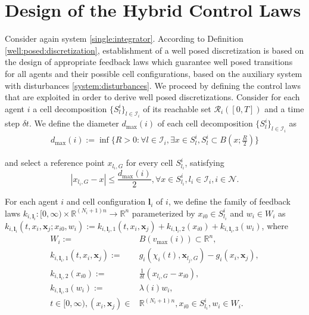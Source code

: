 \documentclass[reqno]{amsart}
\theoremstyle{plain}
\theoremstyle{definition}
\numberwithin{equation}{section}
\begin{document}
\section{Design of the Hybrid Control Laws}

Consider again system  \eqref{single:integrator}. According to Definition \ref{well:posed:discretization}, establishment of a well posed discretization is based on the design of appropriate feedback laws which guarantee well posed transitions for all agents and their possible cell configurations, based on the auxiliary system with disturbances \eqref{system:disturbances}. We proceed by defining the control laws that are exploited in order to derive well posed discretizations. Consider for each agent $i$ a cell decomposition $\{S_{l}^i\}_{l\in{\ensuremath{\mathcal{I}}}_i}$ of its reachable set ${\ensuremath{\mathcal{R}}}_i([0,T])$ and a time step $\delta t$. We define the diameter $d_{\max}(i)$ of each cell decomposition $\{S_l^i\}_{l\in{\ensuremath{\mathcal{I}}}_i}$ as
\begin{align} 
d_{\max}(i):=\inf\{R>0:\forall l\in{\ensuremath{\mathcal{I}}}_i,\exists x\in S_l^i,S_l^i\subset B(x;\tfrac{R}{2})\}  \label{dmax:dfn}
\end{align}

\noindent and select a reference point $x_{l_i,G}$ for every cell $S_{l_i} ^i$, satisfying 
\begin{equation} \label{reference:points}
|x_{l_i,G}-x|\le\frac{d_{\max}(i)}{2},\forall x\in S_{l_i}^i,l_i\in{\ensuremath{\mathcal{I}}}_i,i\in{\ensuremath{\mathcal{N}}}.
\end{equation}

\noindent  For each agent $i$ and cell configuration ${\textbf{{l}}}_i$ of $i$, we define the family of feedback laws  $k_{i,{\textbf{{l}}}_i}:[0,\infty)\times {\ensuremath{\mathbb{R}^{{(N_i+1)n}}}}\to{\ensuremath{\mathbb{R}^{{n}}}}$ parameterized by $x_{i0}\in S_{l_i}^i$ and $w_i\in W_i$ as $k_{i,{\textbf{{l}}}_i}(t,x_i,{\textbf{{x}}}_j;x_{i0},w_i):=k_{i,{\textbf{{l}}}_i,1}(t,x_i,{\textbf{{x}}}_j)+ k_{i,{\textbf{{l}}}_i,2}(x_{i0})+k_{i,{\textbf{{l}}}_i,3}(w_i)$, where
\begin{align}
W_i:= & B(v_{\max}(i))\subset{\ensuremath{\mathbb{R}^{{n}}}}, \label{set:W} \\
k_{i,{\textbf{{l}}}_i,1}(t,x_{i},{\textbf{{x}}}_j):= & g_i(\chi_i(t),{\textbf{{x}}}_{l_j,G})-g_i(x_i,{\textbf{{x}}}_j), \label{feedback:ki1} \\
k_{i,{\textbf{{l}}}_i,2}(x_{i0}):= & \frac{1}{\delta t}(x_{l_i,G}-x_{i0}), \label{feedback:ki2} \\
k_{i,{\textbf{{l}}}_i,3}(w_i):= & \lambda(i)w_i,\label{feedback:ki3:plan} \\
t\in [0,\infty),(x_i,{\textbf{{x}}}_j)\in & {\ensuremath{\mathbb{R}^{{(N_i+1)n}}}},x_{i0}\in S_{l_i}^i,w_i\in W_i. \nonumber
\end{align}
\end{document}
